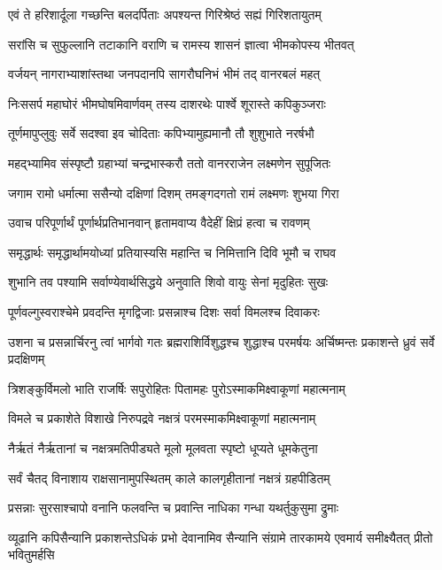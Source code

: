 \twolineshloka
{एवं ते हरिशार्दूला गच्छन्ति बलदर्पिताः}
{अपश्यन्त गिरिश्रेष्ठं सह्यं गिरिशतायुतम्} %

\twolineshloka
{सरांसि च सुफुल्लानि तटाकानि वराणि च}
{रामस्य शासनं ज्ञात्वा भीमकोपस्य भीतवत्} %

\twolineshloka
{वर्जयन् नागराभ्याशांस्तथा जनपदानपि}
{सागरौघनिभं भीमं तद् वानरबलं महत्} %

\twolineshloka
{निःससर्प महाघोरं भीमघोषमिवार्णवम्}
{तस्य दाशरथेः पार्श्वे शूरास्ते कपिकुञ्जराः} %

\twolineshloka
{तूर्णमापुप्लुवुः सर्वे सदश्वा इव चोदिताः}
{कपिभ्यामुह्यमानौ तौ शुशुभाते नरर्षभौ} %

\twolineshloka
{महद्भ्यामिव संस्पृष्टौ ग्रहाभ्यां चन्द्रभास्करौ}
{ततो वानरराजेन लक्ष्मणेन सुपूजितः} %

\twolineshloka
{जगाम रामो धर्मात्मा ससैन्यो दक्षिणां दिशम्}
{तमङ्गदगतो रामं लक्ष्मणः शुभया गिरा} %

\twolineshloka
{उवाच परिपूर्णार्थं पूर्णार्थप्रतिभानवान्}
{हृतामवाप्य वैदेहीं क्षिप्रं हत्वा च रावणम्} %

\twolineshloka
{समृद्धार्थः समृद्धार्थामयोध्यां प्रतियास्यसि}
{महान्ति च निमित्तानि दिवि भूमौ च राघव} %

\twolineshloka
{शुभानि तव पश्यामि सर्वाण्येवार्थसिद्धये}
{अनुवाति शिवो वायुः सेनां मृदुहितः सुखः} %

\twolineshloka
{पूर्णवल्गुस्वराश्चेमे प्रवदन्ति मृगद्विजाः}
{प्रसन्नाश्च दिशः सर्वा विमलश्च दिवाकरः} %

\threelineshloka
{उशना च प्रसन्नार्चिरनु त्वां भार्गवो गतः}
{ब्रह्मराशिर्विशुद्धश्च शुद्धाश्च परमर्षयः}
{अर्चिष्मन्तः प्रकाशन्ते ध्रुवं सर्वे प्रदक्षिणम्} %

\twolineshloka
{त्रिशङ्कुर्विमलो भाति राजर्षिः सपुरोहितः}
{पितामहः पुरोऽस्माकमिक्ष्वाकूणां महात्मनाम्} %

\twolineshloka
{विमले च प्रकाशेते विशाखे निरुपद्रवे}
{नक्षत्रं परमस्माकमिक्ष्वाकूणां महात्मनाम्} %

\twolineshloka
{नैर्ऋतं नैर्ऋतानां च नक्षत्रमतिपीड्यते}
{मूलो मूलवता स्पृष्टो धूप्यते धूमकेतुना} %

\twolineshloka
{सर्वं चैतद् विनाशाय राक्षसानामुपस्थितम्}
{काले कालगृहीतानां नक्षत्रं ग्रहपीडितम्} %

\twolineshloka
{प्रसन्नाः सुरसाश्चापो वनानि फलवन्ति च}
{प्रवान्ति नाधिका गन्धा यथर्तुकुसुमा द्रुमाः} %

\threelineshloka
{व्यूढानि कपिसैन्यानि प्रकाशन्तेऽधिकं प्रभो}
{देवानामिव सैन्यानि संग्रामे तारकामये}
{एवमार्य समीक्ष्यैतत् प्रीतो भवितुमर्हसि} %

